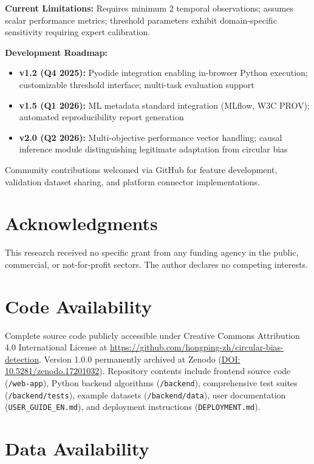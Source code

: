 \documentclass[10pt]{article}
\begin{document}
\textbf{Current Limitations:} Requires minimum 2 temporal observations; assumes scalar performance metrics; threshold parameters exhibit domain-specific sensitivity requiring expert calibration.

\textbf{Development Roadmap:}
\begin{itemize}
    \item \textbf{v1.2 (Q4 2025):} Pyodide integration enabling in-browser Python execution; customizable threshold interface; multi-task evaluation support
    \item \textbf{v1.5 (Q1 2026):} ML metadata standard integration (MLflow, W3C PROV); automated reproducibility report generation
    \item \textbf{v2.0 (Q2 2026):} Multi-objective performance vector handling; causal inference module distinguishing legitimate adaptation from circular bias
\end{itemize}

Community contributions welcomed via GitHub for feature development, validation dataset sharing, and platform connector implementations.

\section*{Acknowledgments}

This research received no specific grant from any funding agency in the public, commercial, or not-for-profit sectors. The author declares no competing interests.

\section*{Code Availability}

Complete source code publicly accessible under Creative Commons Attribution 4.0 International License at \url{https://github.com/hongping-zh/circular-bias-detection}. Version 1.0.0 permanently archived at Zenodo (\href{https://doi.org/10.5281/zenodo.17201032}{DOI: 10.5281/zenodo.17201032}). Repository contents include frontend source code (\texttt{/web-app}), Python backend algorithms (\texttt{/backend}), comprehensive test suites (\texttt{/backend/tests}), example datasets (\texttt{/backend/data}), user documentation (\texttt{USER\_GUIDE\_EN.md}), and deployment instructions (\texttt{DEPLOYMENT.md}).

\section*{Data Availability}
\end{document}
